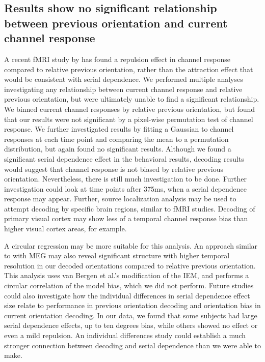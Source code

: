 \documentclass[../main.tex]{subfiles}
\begin{document}
\subsection*{Results show no significant relationship between previous orientation and current channel response}
A recent fMRI study by \cite{Sheehan2021.04.06.438664} has found a repulsion effect in channel response compared to relative previous orientation, rather than the attraction effect that would be consistent with serial dependence. We performed multiple analyses investigating any relationship between current channel response and relative previous orientation, but were ultimately unable to find a significant relationship. We binned current channel responses by relative previous orientation, but found that our results were not significant by a pixel-wise permutation test of channel response. We further investigated results by fitting a Gaussian to channel responses at each time point and comparing the mean to a permutation distribution, but again found no significant results. Although we found a significant serial dependence effect in the behavioral results, decoding results would suggest that channel response is not biased by relative previous orientation. Nevertheless, there is still much investigation to be done. Further investigation could look at time points after 375ms, when a serial dependence response may appear. Further, source localization analysis may be used to attempt decoding by specific brain regions, similar to fMRI studies. Decoding of primary visual cortex may show less of a temporal channel response bias than higher visual cortex areas, for example.

A circular regression may be more suitable for this analysis. An approach similar to \cite{Sheehan2021.04.06.438664} with MEG may also reveal significant structure with higher temporal resolution in our decoded orientations compared to relative previous orientation. This analysis uses van Bergen et al.'s modification of the IEM, and performs a circular correlation of the model bias, which we did not perform. Future studies could also investigate how the individual differences in serial dependence effect size relate to performance in previous orientation decoding and orientation bias in current orientation decoding. In our data, we found that some subjects had large serial dependence effects, up to ten degrees bias, while others showed no effect or even a mild repulsion. An individual differences study could establish a much stronger connection between decoding and serial dependence than we were able to make.
\end{document}
